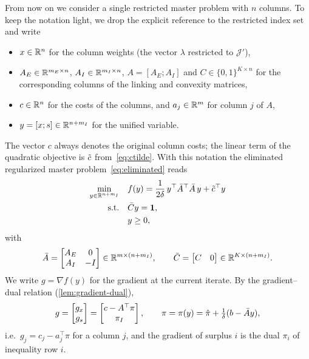 From now on we consider a single restricted master problem with $n$ columns. To keep the
notation light, we drop the explicit reference to the restricted index set and write
\begin{itemize}
    \item $x\in\mathbb{R}^n$ for the column weights (the vector $\lambda$ restricted to $\mathcal{J}'$),
    \item $A_E\in\mathbb{R}^{m_E\times n}$, $A_I\in\mathbb{R}^{m_I\times n}$, $A = [A_E;A_I]$ and
          $C\in\{0,1\}^{K\times n}$ for the corresponding columns of the linking and convexity
          matrices,
    \item $c\in\mathbb{R}^n$ for the costs of the columns, and $a_j\in\mathbb{R}^m$ for column $j$ of $A$,
    \item $y = [x; s]\in\mathbb{R}^{n+m_I}$ for the unified variable.
\end{itemize}
The vector $c$ always denotes the original column costs; the linear term of the quadratic
objective is $\tilde{c}$ from~\eqref{eq:ctilde}. With this notation the eliminated regularized
master problem~\eqref{eq:eliminated} reads
\begin{subequations} \label{eq:qp}
\begin{align}
\min_{y\in\mathbb{R}^{n+m_I}}\quad & f(y) = \frac{1}{2\delta}\,y^\top\bar{A}^\top\bar{A}\,y + \tilde{c}^\top y\\
\text{s.t.}\quad & \bar{C} y = \mathbf{1}, \label{eq:qp-conv}\\
& y\ge0, \label{eq:qp-bounds}
\end{align}
\end{subequations}
with
\[
\bar{A} = \begin{bmatrix} A_E & 0\\ A_I & -I\end{bmatrix}\in\mathbb{R}^{m\times(n+m_I)},\qquad
\bar{C} = \begin{bmatrix} C & 0\end{bmatrix}\in\mathbb{R}^{K\times(n+m_I)} .
\]
We write $g = \nabla f(y)$ for the gradient at the current iterate. By the gradient--dual
relation (\cref{lem:gradient-dual}),
\begin{equation} \label{eq:gradient-split}
g = \begin{bmatrix} g_x\\ g_s\end{bmatrix} = \begin{bmatrix} c - A^\top\pi\\ \pi_I\end{bmatrix},
\qquad \pi = \pi(y) = \hat{\pi} + \tfrac{1}{\delta}(b - \bar{A} y),
\end{equation}
i.e.\ $g_j = c_j - a_j^\top\pi$ for a column $j$, and the gradient of surplus $i$ is the dual
$\pi_i$ of inequality row $i$.


